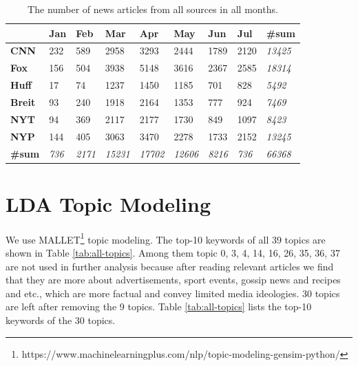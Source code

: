 \documentclass[11pt]{article}
\begin{document}
\begin{table}[ht]
\centering
\begin{tabular}{l|llllllll}
              & \textbf{Jan} & \textbf{Feb}  & \textbf{Mar}   & \textbf{Apr}   & \textbf{May}   & \textbf{Jun}  & \textbf{Jul} & \textbf{\#sum} \\ \hline
\textbf{CNN}   & 232          & 589           & 2958           & 3293           & 2444           & 1789          & 2120         & \textit{13425} \\
\textbf{Fox}   & 156          & 504           & 3938           & 5148           & 3616           & 2367          & 2585         & \textit{18314} \\
\textbf{Huff}  & 17           & 74            & 1237           & 1450           & 1185           & 701           & 828          & \textit{5492}  \\
\textbf{Breit} & 93           & 240           & 1918           & 2164           & 1353           & 777           & 924          & \textit{7469}  \\
\textbf{NYT}   & 94           & 369           & 2117           & 2177           & 1730           & 849           & 1097         & \textit{8423}  \\
\textbf{NYP}   & 144          & 405           & 3063           & 3470           & 2278           & 1733          & 2152         & \textit{13245} \\
\textbf{\#sum} & \textit{736} & \textit{2171} & \textit{15231} & \textit{17702} & \textit{12606} & \textit{8216} & \textit{736} & \textit{66368}
\end{tabular}
\caption{The number of news articles from all sources in all months.}
\label{tab:num-docs}
\end{table}

\section{LDA Topic Modeling}
We use MALLET\footnote{https://www.machinelearningplus.com/nlp/topic-modeling-gensim-python/} topic modeling. The top-10 keywords of all 39 topics are shown in Table \ref{tab:all-topics}. Among them topic 0, 3, 4, 14, 16, 26, 35, 36, 37 are not used in further analysis because after reading relevant articles we find that they are more about advertisements, sport events, gossip news and recipes and etc., which are more factual and convey limited media ideologies. 30 topics are left after removing the 9 topics. 
Table \ref{tab:all-topics} lists the top-10 keywords of the 30 topics.
\end{document}
